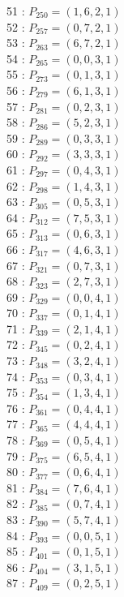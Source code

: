 \documentclass{article}
\begin{document}
{\begin{multicols}{3}
51 : $P_{250}=( 1, 6, 2, 1 )$\\
52 : $P_{257}=( 0, 7, 2, 1 )$\\
53 : $P_{263}=( 6, 7, 2, 1 )$\\
54 : $P_{265}=( 0, 0, 3, 1 )$\\
55 : $P_{273}=( 0, 1, 3, 1 )$\\
56 : $P_{279}=( 6, 1, 3, 1 )$\\
57 : $P_{281}=( 0, 2, 3, 1 )$\\
58 : $P_{286}=( 5, 2, 3, 1 )$\\
59 : $P_{289}=( 0, 3, 3, 1 )$\\
60 : $P_{292}=( 3, 3, 3, 1 )$\\
61 : $P_{297}=( 0, 4, 3, 1 )$\\
62 : $P_{298}=( 1, 4, 3, 1 )$\\
63 : $P_{305}=( 0, 5, 3, 1 )$\\
64 : $P_{312}=( 7, 5, 3, 1 )$\\
65 : $P_{313}=( 0, 6, 3, 1 )$\\
66 : $P_{317}=( 4, 6, 3, 1 )$\\
67 : $P_{321}=( 0, 7, 3, 1 )$\\
68 : $P_{323}=( 2, 7, 3, 1 )$\\
69 : $P_{329}=( 0, 0, 4, 1 )$\\
70 : $P_{337}=( 0, 1, 4, 1 )$\\
71 : $P_{339}=( 2, 1, 4, 1 )$\\
72 : $P_{345}=( 0, 2, 4, 1 )$\\
73 : $P_{348}=( 3, 2, 4, 1 )$\\
74 : $P_{353}=( 0, 3, 4, 1 )$\\
75 : $P_{354}=( 1, 3, 4, 1 )$\\
76 : $P_{361}=( 0, 4, 4, 1 )$\\
77 : $P_{365}=( 4, 4, 4, 1 )$\\
78 : $P_{369}=( 0, 5, 4, 1 )$\\
79 : $P_{375}=( 6, 5, 4, 1 )$\\
80 : $P_{377}=( 0, 6, 4, 1 )$\\
81 : $P_{384}=( 7, 6, 4, 1 )$\\
82 : $P_{385}=( 0, 7, 4, 1 )$\\
83 : $P_{390}=( 5, 7, 4, 1 )$\\
84 : $P_{393}=( 0, 0, 5, 1 )$\\
85 : $P_{401}=( 0, 1, 5, 1 )$\\
86 : $P_{404}=( 3, 1, 5, 1 )$\\
87 : $P_{409}=( 0, 2, 5, 1 )$\\

\end{multicols}}
\end{document}
